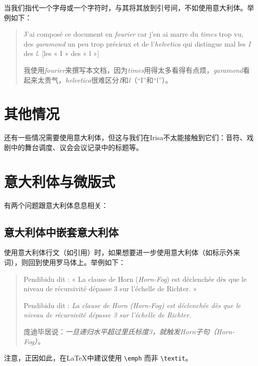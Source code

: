 当我们指代一个字母或一个字符时，与其将其放到引号间，不如使用意大利体。举例如下：

\begin{quote}
    J'ai composé ce document en \emph{fourier} car j'en ai marre du \emph{times} trop vu, des \emph{garamond} un peu trop précieux et de l'\emph{helvetica} qui distingue mal les \emph{I} des \emph{l}. [les « I » des « l »]

    \begin{bil}
        我使用\emph{fourier}来撰写本文档，因为\emph{times}用得太多看得有点烦，\emph{garamond}看起来太贵气，\emph{helvetica}很难区分\emph{I}和\emph{l}（``I''和``l''）。
    \end{bil}
\end{quote}

\section{其他情况}

还有一些情况需要使用意大利体，但这与我们在Irisa不太能接触到它们：音符、戏剧中的舞台调度、议会会议记录中的标题等。

\section{意大利体与微版式}

有两个问题跟意大利体息息相关：

\subsection{意大利体中嵌套意大利体}

使用意大利体行文（如引用）时，如果想要进一步使用意大利体（如标示外来词），则回到使用罗马体上。举例如下：

\begin{quote}
    Pendibidu dit : « La clause de Horn (\emph{Horn-Fog}) est déclenchée dès que le niveau de récursivité dépasse 3 sur l'échelle de Richter. »

    Pendibidu dit : \emph{La clause de Horn \emph{(Horn-Fog)} est déclenchée dès que le niveau de récursivité dépasse 3 sur l'échelle de Richter.}

    \begin{bil}
        庞迪毕居说：\emph{一旦递归水平超过里氏标度3，就触发Horn子句\emph{（Horn-Fog）}。}
    \end{bil}
\end{quote}

注意，正因如此，在\LaTeX 中建议使用 \verb+\emph+ 而非 \verb+\textit+。

